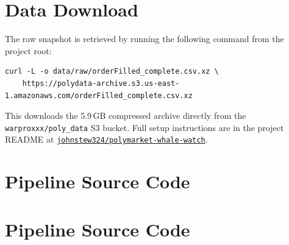 \documentclass[11pt]{article}
\begin{document}
\section{Data Download}
\label{app:download}

The raw snapshot is retrieved by running the following command from the
project root:

\begin{verbatim}
curl -L -o data/raw/orderFilled_complete.csv.xz \
    https://polydata-archive.s3.us-east-1.amazonaws.com/orderFilled_complete.csv.xz
\end{verbatim}

\noindent This downloads the 5.9\,GB compressed archive directly from
the \texttt{warproxxx/poly\_data} S3 bucket. Full setup instructions
are in the project README at
\href{https://github.com/johnstew324/polymarket-whale-watch}{%
\faGithub\;\texttt{johnstew324/polymarket-whale-watch}}.


\section{Pipeline Source Code}
\label{app:code}


\section{Pipeline Source Code}
\label{app:code}

\end{document}
